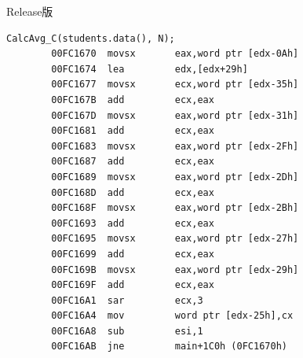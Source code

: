 \documentclass[supercite]{Experimental_Report}
\theoremstyle{definition}
\begin{document}
	Release版
	\begin{lstlisting}[style=commonCodeStyle, caption={release.asm}, label={lst:2-3}]
		CalcAvg_C(students.data(), N);
		00FC1670  movsx       eax,word ptr [edx-0Ah]  
		00FC1674  lea         edx,[edx+29h]  
		00FC1677  movsx       ecx,word ptr [edx-35h]  
		00FC167B  add         ecx,eax  
		00FC167D  movsx       eax,word ptr [edx-31h]  
		00FC1681  add         ecx,eax  
		00FC1683  movsx       eax,word ptr [edx-2Fh]  
		00FC1687  add         ecx,eax  
		00FC1689  movsx       eax,word ptr [edx-2Dh]  
		00FC168D  add         ecx,eax  
		00FC168F  movsx       eax,word ptr [edx-2Bh]  
		00FC1693  add         ecx,eax  
		00FC1695  movsx       eax,word ptr [edx-27h]  
		00FC1699  add         ecx,eax  
		00FC169B  movsx       eax,word ptr [edx-29h]  
		00FC169F  add         ecx,eax  
		00FC16A1  sar         ecx,3  
		00FC16A4  mov         word ptr [edx-25h],cx  
		00FC16A8  sub         esi,1  
		00FC16AB  jne         main+1C0h (0FC1670h)  
	\end{lstlisting}
	
\end{document}
